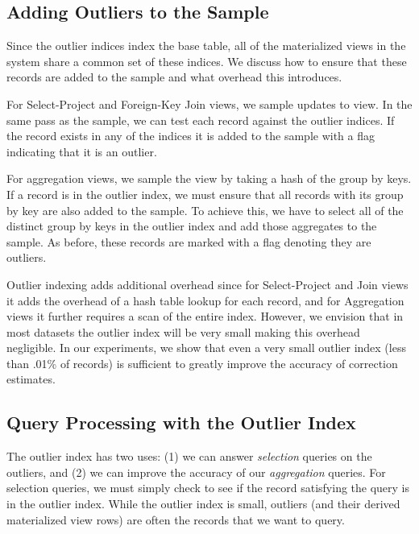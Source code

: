\subsection{Adding Outliers to the Sample}
Since the outlier indices index the base table, all of the materialized views in the system share a common set of these indices.
We discuss how to ensure that these records are added to the sample and what overhead this introduces.


For Select-Project and Foreign-Key Join views, we sample updates to view.
In the same pass as the sample, we can test each record against the outlier indices. 
If the record exists in any of the indices it is added to the sample with a flag indicating that it is an outlier.

For aggregation views, we sample the view by taking a hash of the group by keys.
If a record is in the outlier index, we must ensure that all records with its group by key are also added to the sample.
To achieve this, we have to select all of the distinct group by keys in the outlier index and add those aggregates to the sample.
As before, these records are marked with a flag denoting they are outliers.

Outlier indexing adds additional overhead since for Select-Project and Join views it adds the overhead of a hash table lookup for each record, and for Aggregation views it further requires a scan of the entire index. 
However, we envision that in most datasets the outlier index will be very small making this overhead negligible.
In our experiments, we show that even a very small outlier index (less than .01\% of records) is sufficient to greatly improve the accuracy of
correction estimates.

\subsection{Query Processing with the Outlier Index} 
The outlier index has two uses: (1) we can answer \emph{selection} queries on the outliers, 
and (2) we can improve the accuracy of our \emph{aggregation} queries.
For selection queries, we must simply check to see if the record satisfying the query is in the outlier index.
While the outlier index is small, outliers (and their derived materialized view rows) are often the records that
we want to query.

